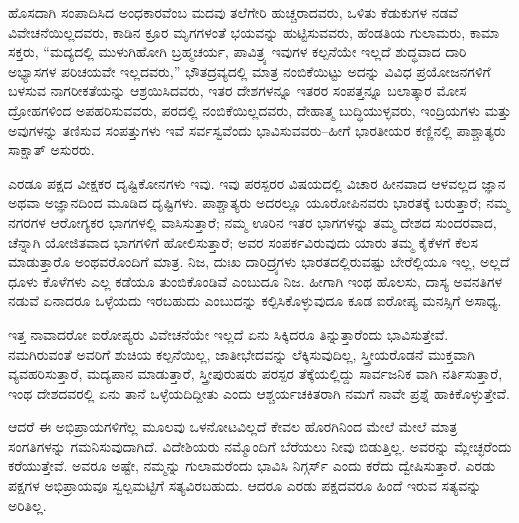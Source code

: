 \vskip 4pt

ಹೊಸದಾಗಿ ಸಂಪಾದಿಸಿದ ಅಂಧಕಾರವೆಂಬ ಮದವು ತಲೆಗೇರಿ ಹುಚ್ಚರಾದವರು, ಒಳಿತು ಕೆಡುಕುಗಳ ನಡವೆ ವಿವೇಚನೆಯಿಲ್ಲದವರು, ಕಾಡಿನ ಕ್ರೂರ ಮೃಗಗಳಂತೆ ಭಯವನ್ನು ಹುಟ್ಟಿಸುವವರು, ಹೆಂಡತಿಯ ಗುಲಾಮರು, ಕಾಮಾ ಸಕ್ತರು, “ಮದ್ಯದಲ್ಲಿ ಮುಳುಗಿಹೋಗಿ ಬ್ರಹ್ಮಚರ್ಯ, ಪಾವಿತ್ರ್ಯ ಇವುಗಳ ಕಲ್ಪನೆಯೇ ಇಲ್ಲದೆ ಶುದ್ಧವಾದ ದಾರಿ ಅಭ್ಯಾಸಗಳ ಪರಿಚಯವೇ ಇಲ್ಲದವರು,” ಭೌತದ್ರವ್ಯದಲ್ಲಿ ಮಾತ್ರ ನಂಬಿಕೆಯಿಟ್ಟು ಅದನ್ನು ವಿವಿಧ ಪ್ರಯೋಜನಗಳಿಗೆ ಬಳಸುವ ನಾಗರೀಕತೆಯನ್ನು ಆಶ್ರಯಿಸಿದವರು, ಇತರ ದೇಶಗಳನ್ನೂ ಇತರರ ಸಂಪತ್ತನ್ನೂ ಬಲಾತ್ಕಾರ ಮೋಸ ದ್ರೋಹಗಳಿಂದ ಅಪಹರಿಸುವವರು, ಪರದಲ್ಲಿ ನಂಬಿಕೆಯಿಲ್ಲದವರು, ದೇಹಾತ್ಮ ಬುದ್ಧಿಯುಳ್ಳವರು, ಇಂದ್ರಿಯಗಳು ಮತ್ತು ಅವುಗಳನ್ನು ತಣಿಸುವ ಸಂಪತ್ತುಗಳು ಇವೆ ಸರ್ವಸ್ವವೆಂದು ಭಾವಿಸುವವರು–ಹೀಗೆ ಭಾರತೀಯರ ಕಣ್ಣಿನಲ್ಲಿ ಪಾಶ್ಚಾತ್ಯರು ಸಾಕ್ಷಾತ್​ ಅಸುರರು.

\vskip 4pt

ಎರಡೂ ಪಕ್ಷದ ವೀಕ್ಷಕರ ದೃಷ್ಟಿಕೋನಗಳು ಇವು. ಇವು ಪರಸ್ಪರರ ವಿಷಯದಲ್ಲಿ ವಿಚಾರ ಹೀನವಾದ ಆಳವಲ್ಲದ ಜ್ಞಾನ ಅಥವಾ ಅಜ್ಞಾನದಿಂದ ಮೂಡಿದ ದೃಷ್ಟಿಗಳು. ಪಾಶ್ಚಾತ್ಯರು ಅದರಲ್ಲೂ ಯೂರೋಪಿನವರು ಭಾರತಕ್ಕೆ ಬರುತ್ತಾರೆ; ನಮ್ಮ ನಗರಗಳ ಆರೋಗ್ಯಕರ ಭಾಗಗಳಲ್ಲಿ ವಾಸಿಸುತ್ತಾರೆ; ನಮ್ಮ ಊರಿನ ಇತರ ಭಾಗಗಳನ್ನು ತಮ್ಮ ದೇಶದ ಸುಂದರವಾದ, ಚೆನ್ನಾಗಿ ಯೋಜಿತವಾದ ಭಾಗಗಳಿಗೆ ಹೋಲಿಸುತ್ತಾರೆ; ಅವರ ಸಂಪರ್ಕವಿರುವುದು ಯಾರು ತಮ್ಮ ಕೈಕೆಳಗೆ ಕೆಲಸ ಮಾಡುತ್ತಾರೊ ಅಂಥವರೊಂದಿಗೆ ಮಾತ್ರ. ನಿಜ, ದುಃಖ ದಾರಿದ್ರ್ಯಗಳು ಭಾರತದಲ್ಲಿರುವಷ್ಟು ಬೇರೆಲ್ಲಿಯೂ ಇಲ್ಲ, ಅಲ್ಲದೆ ಧೂಳು ಕೊಳೆಗಳು ಎಲ್ಲ ಕಡೆಯೂ ತುಂಬಿಕೊಂಡಿವೆ ಎಂಬುದೂ ನಿಜ. ಹೀಗಾಗಿ ಇಂಥ ಹೊಲಸು, ದಾಸ್ಯ ಅವನತಿಗಳ ನಡುವೆ ಏನಾದರೂ ಒಳ್ಳೆಯದು ಇರಬಹುದು ಎಂಬುದನ್ನು ಕಲ್ಪಿಸಿಕೊಳ್ಳುವುದೂ ಕೂಡ ಐರೋಪ್ಯ ಮನಸ್ಸಿಗೆ ಅಸಾಧ್ಯ.

ಇತ್ತ ನಾವಾದರೋ ಐರೋಪ್ಯರು ವಿವೇಚನೆಯೇ ಇಲ್ಲದೆ ಏನು ಸಿಕ್ಕಿದರೂ ತಿನ್ನುತ್ತಾರೆಂದು ಭಾವಿಸುತ್ತೇವೆ. ನಮಗಿರುವಂತೆ ಅವರಿಗೆ ಶುಚಿಯ ಕಲ್ಪನೆಯಿಲ್ಲ, ಜಾತೀಭೇದವನ್ನು ಲೆಕ್ಕಿಸುವುದಿಲ್ಲ, ಸ್ತ್ರೀಯರೊಡನೆ ಮುಕ್ತವಾಗಿ ವ್ಯವಹರಿಸುತ್ತಾರೆ, ಮದ್ಯಪಾನ ಮಾಡುತ್ತಾರೆ, ಸ್ತ್ರೀಪುರುಷರು ಪರಸ್ಪರ ತೆಕ್ಕೆಯಲ್ಲಿದ್ದು ಸಾರ್ವಜನಿಕ ವಾಗಿ ನರ್ತಿಸುತ್ತಾರೆ, ಇಂಥ ದೇಶದವರಲ್ಲಿ ಏನು ತಾನೆ ಒಳ್ಳೆಯದಿದ್ದೀತು ಎಂದು ಆಶ್ಚರ್ಯಚಕಿತರಾಗಿ ನಮಗೆ ನಾವೇ ಪ್ರಶ್ನೆ ಹಾಕಿಕೊಳ್ಳುತ್ತೇವೆ.

ಆದರೆ ಈ ಅಭಿಪ್ರಾಯಗಳಿಗೆಲ್ಲ ಮೂಲವು ಒಳನೋಟವಿಲ್ಲದೆ ಕೇವಲ ಹೊರಗಿನಿಂದ ಮೇಲೆ ಮೇಲೆ ಮಾತ್ರ ಸಂಗತಿಗಳನ್ನು ಗಮನಿಸುವುದಾಗಿದೆ. ವಿದೇಶಿಯರು ನಮ್ಮೊಂದಿಗೆ ಬೆರೆಯಲು ನೀವು ಬಿಡುತ್ತಿಲ್ಲ. ಅವರನ್ನು ಮ್ಲೇಚ್ಛರೆಂದು ಕರೆಯುತ್ತೇವೆ. ಅವರೂ ಅಷ್ಟೇ, ನಮ್ಮನ್ನು ಗುಲಾಮರೆಂದು ಭಾವಿಸಿ ನಿಗ್ಗರ್ಸ್​ ಎಂದು ಕರೆದು ದ್ವೇಷಿಸುತ್ತಾರೆ. ಎರಡು ಪಕ್ಷಗಳ ಅಭಿಪ್ರಾಯವೂ ಸ್ವಲ್ಪಮಟ್ಟಿಗೆ ಸತ್ಯವಿರಬಹುದು. ಆದರೂ ಎರಡು ಪಕ್ಷದವರೂ ಹಿಂದೆ ಇರುವ ಸತ್ಯವನ್ನು ಅರಿತಿಲ್ಲ.

